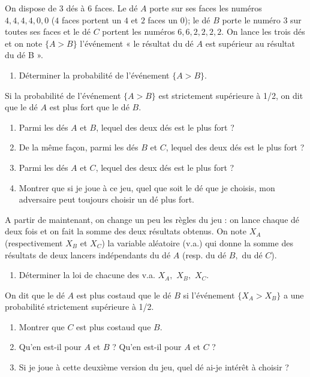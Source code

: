 \documentclass[a4paper,12pt,reqno]{amsart}
\begin{document}
\begin{exo}

  On dispose de $3$ dés à $6$ faces. Le dé $A$ porte sur ses faces les numéros $4,4,4,4,0,0$ ($4$ faces portent un $4$ et $2$ faces un $0$); le dé $B$ porte le numéro $3$ sur toutes ses faces et le dé $C$ portent les numéros $6,6,2,2,2,2.$ On lance les trois dés et on note $\{A>B\}$ l'événement « le résultat du dé $A$ est supérieur au résultat du dé B ».
  \begin{enumerate}
    \item Déterminer la probabilité de l'événement $\{A>B\}$.
  \end{enumerate}
  Si la probabilité de l'événement  $\{A>B\}$ est strictement supérieure  à 1/2, on dit que le dé $A$ est plus fort que le dé $B.$
  \begin{enumerate}[resume]
    \item Parmi les dés $A$ et $B$, lequel des deux dés est le plus fort ?
    \item De la même façon, parmi les dés $B$ et $C$, lequel des deux dés est le plus fort ?
    \item Parmi les dés $A$ et $C$, lequel des deux dés est le plus fort ?
    \item Montrer que si je joue à ce jeu, quel que soit le dé que je choisis, mon adversaire peut toujours choisir un dé plus fort.
  \end{enumerate}
  A partir de maintenant, on change un peu les règles du jeu : on lance chaque dé deux fois et on fait la somme des deux résultats obtenus.
  On note $X_A$ (respectivement $X_B$ et $X_C$) la variable aléatoire (v.a.) qui donne la somme des résultats de deux lancers indépendants du dé $A$ (resp. du dé $B,$ du dé $C$).
  \begin{enumerate}[resume]
    \item Déterminer la loi  de chacune des v.a. $X_A,$ $X_B,$ $X_C.$
  \end{enumerate}
  On dit que le dé $A$ est plus costaud que le dé $B$ si l'événement $\{X_A >X_B\}$ a une probabilité strictement supérieure à 1/2.
  \begin{enumerate}[resume]
    \item Montrer que $C$ est plus costaud que $B.$
    \item Qu'en est-il pour $A$ et $B$ ? Qu'en est-il pour $A$ et $C$ ?
    \item Si je joue à cette deuxième version du jeu, quel dé ai-je intérêt à choisir ? \\
  \end{enumerate}

\end{exo}
\end{document}
